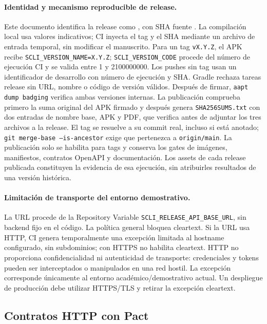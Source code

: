 \paragraph{Identidad y mecanismo reproducible de release.}
Este documento identifica la release como \texttt{\SCLIReleaseVersion},
con SHA fuente \texttt{\SCLIReleaseCommit}. La compilación local usa valores
indicativos; CI inyecta el tag y el SHA mediante un archivo de entrada temporal,
sin modificar el manuscrito. Para un tag \texttt{vX.Y.Z}, el APK recibe
\texttt{SCLI\_VERSION\_NAME=X.Y.Z}; \texttt{SCLI\_VERSION\_CODE} procede
del número de ejecución CI y se valida entre 1 y 2100000000. Los pushes sin
tag usan un identificador de desarrollo con número de ejecución y SHA.
Gradle rechaza tareas release sin URL, nombre o código de versión válidos.
Después de firmar, \texttt{aapt dump badging} verifica ambas versiones internas.
La publicación comprueba primero la suma original del APK firmado y después
genera \texttt{SHA256SUMS.txt} con dos entradas de nombre base, APK y PDF,
que verifica antes de adjuntar los tres archivos a la release. El tag se
resuelve a su commit real, incluso si está anotado; \texttt{git merge-base
--is-ancestor} exige que pertenezca a \texttt{origin/main}. La publicación
solo se habilita para tags y conserva los gates de imágenes, manifiestos,
contratos OpenAPI y documentación. Los assets de cada release publicada
constituyen la evidencia de esa ejecución, sin atribuirles resultados de
una versión histórica.

\paragraph{Limitación de transporte del entorno demostrativo.}
La URL procede de la Repository Variable
\texttt{SCLI\_RELEASE\_API\_BASE\_URL}, sin backend fijo en el código.
La política general bloquea cleartext. Si la URL usa HTTP, CI genera
temporalmente una excepción limitada al hostname configurado, sin subdominios;
con HTTPS no habilita cleartext. HTTP no proporciona confidencialidad ni
autenticidad de transporte: credenciales y tokens pueden ser interceptados
o manipulados en una red hostil. La excepción corresponde únicamente al
entorno académico/demostrativo actual. Un despliegue de producción debe
utilizar HTTPS/TLS y retirar la excepción cleartext.

\subsection{Contratos HTTP con Pact}
\label{subsec:pact}

